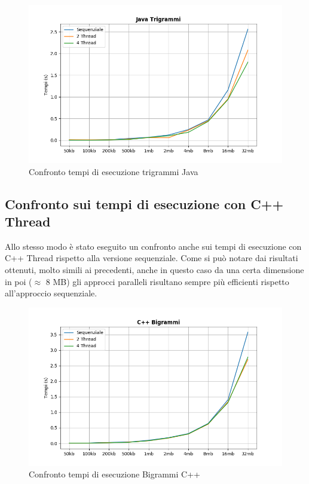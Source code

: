 \documentclass[10pt,twocolumn,letterpaper]{article}
\begin{document}
\begin{figure}[h]
\includegraphics[width=\linewidth]{Plots/tempi_java_trigrammi.png}
\caption{Confronto tempi di esecuzione trigrammi Java}
\end{figure}

\subsection{Confronto sui tempi di esecuzione con C++ Thread}
Allo stesso modo è stato eseguito un confronto anche sui tempi di esecuzione con C++ Thread rispetto alla versione sequenziale.
Come si può notare dai risultati ottenuti, molto simili ai precedenti, anche in questo caso da una certa dimensione in poi ($\approx$ 8 MB) gli approcci paralleli risultano sempre più efficienti rispetto all'approccio sequenziale.
\begin{figure}[h]
\includegraphics[width=\linewidth]{Plots/tempi_cpp_bigrammi.png}
\caption{Confronto tempi di esecuzione Bigrammi C++}
\end{figure}
\end{document}
